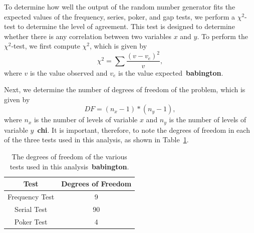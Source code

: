 \documentclass[12pt]{article}
\numberwithin{equation}{section}
\begin{document}
\par To determine how well the output of the random number generator fits the expected values of the frequency, series, poker, and gap tests, we perform a $\chi^{2}$-test to determine the level of agreement.  This test is designed to determine whether there is any correlation between two variables $x$ and $y$.  To perform the $\chi^{2}$-test, we first compute $\chi^{2}$, which is given by
\begin{equation}
\label{eq:chi2}
\chi^{2}=\sum\frac{\left(v-v_{e}\right)^{2}}{v},
\end{equation}
where $v$ is the value observed and $v_{e}$ is the value expected~\textbf{babington}.  
\par Next, we determine the number of degrees of freedom of the problem, which is given by 
\begin{equation}
\label{eq:degfree}
DF = (n_{x}-1)*(n_{y}-1),
\end{equation}
where $n_{x}$ is the number of levels of variable $x$ and $n_{y}$ is the number of levels of variable $y$~\textbf{chi}.  It is important, therefore, to note the degrees of freedom in each of the three tests used in this analysis, as shown in Table~\ref{tab:degfree}.

\begin{table}[ht]
\begin{center}
\begin{tabular}{c|c} \hline
	Test & Degrees of Freedom \\ \hline
     Frequency Test & 9 \\
     Serial Test & 90 \\
     Poker Test & 4 \\ \hline
\end{tabular}
\caption{The degrees of freedom of the various tests used in this analysis~\textbf{babington}.}
\label{tab:degfree}
\end{center}
\end{table}
\end{document}
